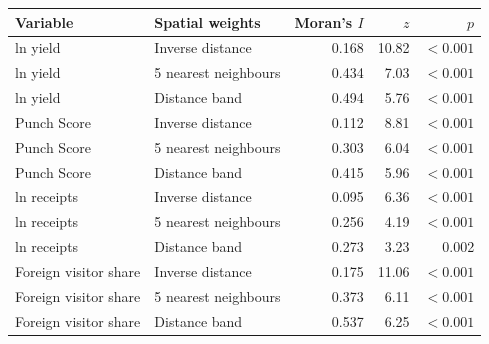 \begin{tabular}{llrrr}
\toprule
Variable & Spatial weights & Moran's $I$ & $z$ & $p$ \\
\midrule
ln yield & Inverse distance & 0.168 & 10.82 & $<0.001$ \\
ln yield & 5 nearest neighbours & 0.434 & 7.03 & $<0.001$ \\
ln yield & Distance band & 0.494 & 5.76 & $<0.001$ \\
Punch Score & Inverse distance & 0.112 & 8.81 & $<0.001$ \\
Punch Score & 5 nearest neighbours & 0.303 & 6.04 & $<0.001$ \\
Punch Score & Distance band & 0.415 & 5.96 & $<0.001$ \\
ln receipts & Inverse distance & 0.095 & 6.36 & $<0.001$ \\
ln receipts & 5 nearest neighbours & 0.256 & 4.19 & $<0.001$ \\
ln receipts & Distance band & 0.273 & 3.23 & 0.002 \\
Foreign visitor share & Inverse distance & 0.175 & 11.06 & $<0.001$ \\
Foreign visitor share & 5 nearest neighbours & 0.373 & 6.11 & $<0.001$ \\
Foreign visitor share & Distance band & 0.537 & 6.25 & $<0.001$ \\
\bottomrule
\end{tabular}
